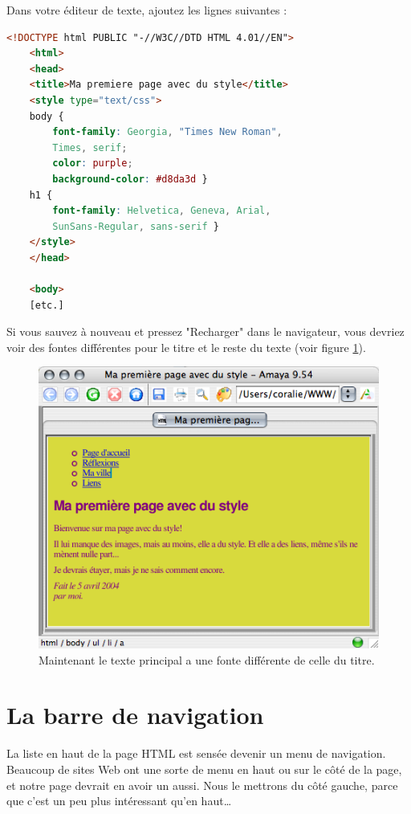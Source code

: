 Dans votre éditeur de texte, ajoutez les lignes suivantes : 
\begin{lstlisting}[language=html]
	<!DOCTYPE html PUBLIC "-//W3C//DTD HTML 4.01//EN">
	<html>
	<head>
	<title>Ma premiere page avec du style</title>
	<style type="text/css">
	body {
		font-family: Georgia, "Times New Roman",
		Times, serif;
		color: purple;
		background-color: #d8da3d }
	h1 {
		font-family: Helvetica, Geneva, Arial,
		SunSans-Regular, sans-serif }
	</style>
	</head>
	
	<body>
	[etc.]
\end{lstlisting}
Si vous sauvez à nouveau et pressez "Recharger" dans le navigateur, vous devriez voir des fontes différentes pour le titre et le reste du texte (voir figure \ref{fig:screen4}).
\begin{figure}[t]
	\begin{center}
		\includegraphics{voronin/img/capture3.png}	
		\caption{Maintenant le texte principal a une fonte différente de celle du titre.  }
		\label{fig:screen4}
	\end{center}
\end{figure} 
\section{La barre de navigation}
La liste en haut de la page HTML est sensée devenir un menu de navigation. Beaucoup de sites Web ont une sorte de menu en haut ou sur le côté de la page, et notre page devrait en avoir un aussi. Nous le mettrons du côté gauche, parce que c'est un peu plus intéressant qu'en haut…

